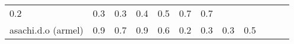 \documentclass[parskip=half]{scrartcl}
\begin{document}
\begin{table}[h]
\begin{tabular}{@{}llllllllllll@{}}
\begin{minipage}[t]{0.05\columnwidth}
0.2\strut
\end{minipage} & \begin{minipage}[t]{0.05\columnwidth}\raggedright\strut
0.3\strut
\end{minipage} & \begin{minipage}[t]{0.05\columnwidth}\raggedright\strut
0.3\strut
\end{minipage} & \begin{minipage}[t]{0.05\columnwidth}\raggedright\strut
0.4\strut
\end{minipage} & \begin{minipage}[t]{0.05\columnwidth}\raggedright\strut
0.5\strut
\end{minipage} & \begin{minipage}[t]{0.05\columnwidth}\raggedright\strut
0.7\strut
\end{minipage} & \begin{minipage}[t]{0.05\columnwidth}\raggedright\strut
0.7\strut
\end{minipage}\tabularnewline
\begin{minipage}[t]{0.12\columnwidth}\raggedright\strut
asachi.d.o (armel)\strut
\end{minipage} & \begin{minipage}[t]{0.05\columnwidth}\raggedright\strut
0.9\strut
\end{minipage} & \begin{minipage}[t]{0.05\columnwidth}\raggedright\strut
0.7\strut
\end{minipage} & \begin{minipage}[t]{0.05\columnwidth}\raggedright\strut
0.9\strut
\end{minipage} & \begin{minipage}[t]{0.05\columnwidth}\raggedright\strut
0.6\strut
\end{minipage} & \begin{minipage}[t]{0.05\columnwidth}\raggedright\strut
0.2\strut
\end{minipage} & \begin{minipage}[t]{0.05\columnwidth}\raggedright\strut
0.3\strut
\end{minipage} & \begin{minipage}[t]{0.05\columnwidth}\raggedright\strut
0.3\strut
\end{minipage} & \begin{minipage}[t]{0.05\columnwidth}\raggedright\strut
0.5\strut
\end{minipage} & \begin{minipage}[t]{0.05\columnwidth}\raggedright\strut

\end{minipage}
\end{tabular}
\end{table}
\end{document}
